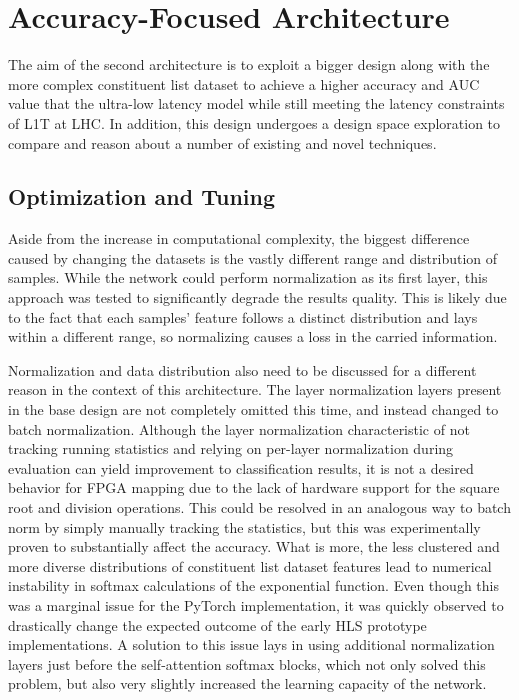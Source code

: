 \section{Accuracy-Focused Architecture}\label{accuracy-focused-model}
The aim of the second architecture is to exploit a bigger design along with the more complex constituent list dataset to achieve a higher accuracy and AUC value that the ultra-low latency model while still meeting the latency constraints of L1T at LHC. In addition, this design undergoes a design space exploration to compare and reason about a number of existing and novel techniques.

\subsection{Optimization and Tuning}
Aside from the increase in computational complexity, the biggest difference caused by changing the datasets is the vastly different range and distribution of samples. While the network could perform normalization as its first layer, this approach was tested to significantly degrade the results quality. This is likely due to the fact that each samples' feature follows a distinct distribution and lays within a different range, so normalizing causes a loss in the carried information.

Normalization and data distribution also need to be discussed for a different reason in the context of this architecture. The layer normalization layers present in the base design are not completely omitted this time, and instead changed to batch normalization. Although the layer normalization characteristic of not tracking running statistics and relying on per-layer normalization during evaluation can yield improvement to classification results, it is not a desired behavior for FPGA mapping due to the lack of hardware support for the square root and division operations. This could be resolved in an analogous way to batch norm by simply manually tracking the statistics, but this was experimentally proven to substantially affect the accuracy. What is more, the less clustered and more diverse distributions of constituent list dataset features lead to numerical instability in softmax calculations of the exponential function. Even though this was a marginal issue for the PyTorch implementation, it was quickly observed to drastically change the expected outcome of the early HLS prototype implementations. A solution to this issue lays in using additional normalization layers just before the self-attention softmax blocks, which not only solved this problem, but also very slightly increased the learning capacity of the network.

